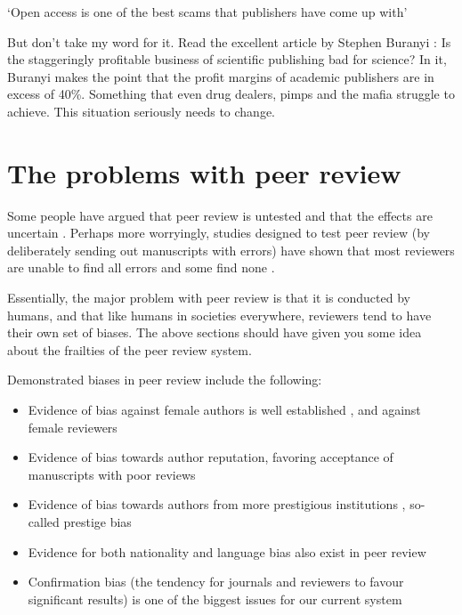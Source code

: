 \documentclass[
]{krantz}
\providecommand{\tightlist}{%
  \setlength{\itemsep}{0pt}\setlength{\parskip}{0pt}}
\renewenvironment{quote}{\begin{VF}}{\end{VF}}
\renewcommand{\href}[2]{#2\footnote{\url{#1}}}
\begin{document}
\begin{quote}
`Open access is one of the best scams that publishers have come up with'
\end{quote}

But don't take my word for it. Read the excellent article by Stephen Buranyi \citeyearpar{buranyi2017staggeringly}: Is the staggeringly profitable business of scientific publishing bad for science? In it, Buranyi makes the point that the profit margins of academic publishers are in excess of 40\%. Something that even drug dealers, pimps and the mafia struggle to achieve. This situation seriously needs to change.

\hypertarget{problempeerreview}{%
\chapter{The problems with peer review}\label{problempeerreview}}

Some people have argued that peer review is untested and that the effects are uncertain \citep{jefferson2002effects}. Perhaps more worryingly, studies designed to test peer review (by deliberately sending out manuscripts with errors) have shown that most reviewers are unable to find all errors and some find none \citep{rothwell2000reproducibility}.

Essentially, the major problem with peer review is that it is conducted by humans, and that like humans in societies everywhere, reviewers tend to have their own set of biases. The above sections should have given you some idea about the frailties of the peer review system.

Demonstrated biases in peer review include the following:

\begin{itemize}
\tightlist
\item
  Evidence of bias against female authors is well established \citep[e.g.][]{tregenza2002gender, manlove2018authors}, and against female reviewers \citep{helmer2017gender}
\item
  Evidence of bias towards author reputation, favoring acceptance of manuscripts with poor reviews \citep{bravo2018hidden}
\item
  Evidence of bias towards authors from more prestigious institutions \citep{tomkins2017single, manlove2018authors}, so-called prestige bias \citep{lee2013bias}
\item
  Evidence for both nationality and language bias also exist in peer review \citep{lee2013bias, manlove2018authors, nunez2021monolingual}
\item
  Confirmation bias (the tendency for journals and reviewers to favour significant results) is one of the biggest issues for our current system \citep[see][ and \href{transparency.html}{part IV}]{fanelli2010positive}
\end{itemize}
\end{document}
